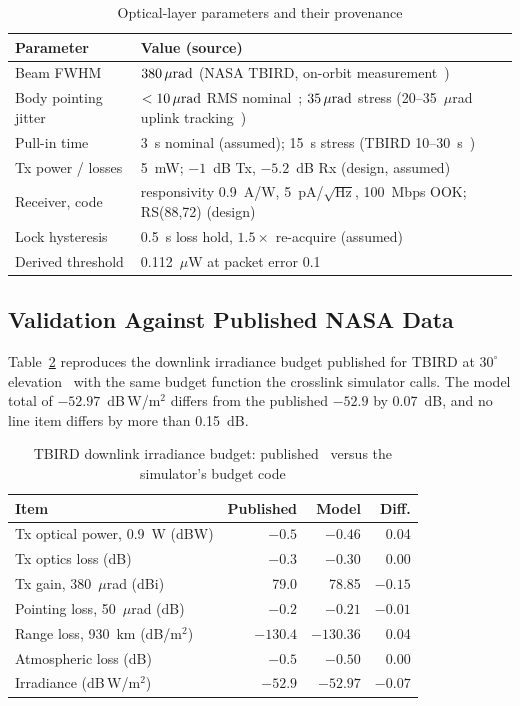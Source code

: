 \begin{table}[!t]
\caption{Optical-layer parameters and their provenance}
\label{tab:optics}
\centering\footnotesize
\begin{tabular}{@{}p{}p{}@{}}
\toprule
Parameter & Value (source)\\
\midrule
Beam FWHM & $380\,\mu\text{rad}$ (NASA TBIRD, on-orbit measurement~\cite{schieler2023})\\
Body pointing jitter & $<10\,\mu\text{rad}$ RMS nominal~\cite{schieler2023icsos}; $35\,\mu\text{rad}$ stress (20--35~$\mu$rad uplink tracking~\cite{schieler2023})\\
Pull-in time & 3~s nominal (assumed); 15~s stress (TBIRD 10--30~s~\cite{schieler2023})\\
Tx power / losses & 5~mW; $-1$~dB Tx, $-5.2$~dB Rx (design, assumed)\\
Receiver, code & responsivity 0.9~A/W, 5~pA/$\sqrt{\text{Hz}}$, 100~Mbps OOK; RS(88,72) (design)\\
Lock hysteresis & 0.5~s loss hold, $1.5\times$ re-acquire (assumed)\\
Derived threshold & 0.112~$\mu$W at packet error 0.1\\
\bottomrule
\end{tabular}
\end{table}

\subsection{Validation Against Published NASA Data}
Table~\ref{tab:tbird} reproduces the downlink irradiance budget published for TBIRD at $30^\circ$ elevation~\cite{schieler2023} with the same budget function the crosslink simulator calls. The model total of $-52.97$~dB\,W/m$^2$ differs from the published $-52.9$ by 0.07~dB, and no line item differs by more than 0.15~dB.

\begin{table}[!t]
\caption{TBIRD downlink irradiance budget: published~\cite{schieler2023} versus the simulator's budget code}
\label{tab:tbird}
\centering\footnotesize
\begin{tabular}{@{}lrrr@{}}
\toprule
Item & Published & Model & Diff.\\
\midrule
Tx optical power, 0.9~W (dBW) & $-0.5$ & $-0.46$ & 0.04\\
Tx optics loss (dB) & $-0.3$ & $-0.30$ & 0.00\\
Tx gain, 380~$\mu$rad (dBi) & 79.0 & 78.85 & $-0.15$\\
Pointing loss, 50~$\mu$rad (dB) & $-0.2$ & $-0.21$ & $-0.01$\\
Range loss, 930~km (dB/m$^2$) & $-130.4$ & $-130.36$ & 0.04\\
Atmospheric loss (dB) & $-0.5$ & $-0.50$ & 0.00\\
\midrule
Irradiance (dB\,W/m$^2$) & $-52.9$ & $-52.97$ & $-0.07$\\
\bottomrule
\end{tabular}
\end{table}

